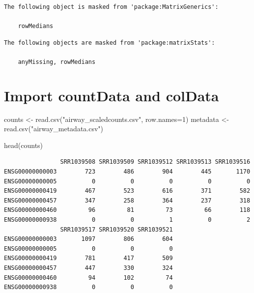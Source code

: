 \documentclass[
  letterpaper,
  DIV=11,
  numbers=noendperiod]{scrartcl}
\newenvironment{Shaded}{\begin{snugshade}}{\end{snugshade}}
\newcommand{\AttributeTok}[1]{\textcolor[rgb]{0.40,0.45,0.13}{#1}}
\newcommand{\DecValTok}[1]{\textcolor[rgb]{0.68,0.00,0.00}{#1}}
\newcommand{\FunctionTok}[1]{\textcolor[rgb]{0.28,0.35,0.67}{#1}}
\newcommand{\NormalTok}[1]{\textcolor[rgb]{0.00,0.23,0.31}{#1}}
\newcommand{\OtherTok}[1]{\textcolor[rgb]{0.00,0.23,0.31}{#1}}
\newcommand{\StringTok}[1]{\textcolor[rgb]{0.13,0.47,0.30}{#1}}
\begin{document}
\begin{verbatim}
The following object is masked from 'package:MatrixGenerics':

    rowMedians
\end{verbatim}

\begin{verbatim}
The following objects are masked from 'package:matrixStats':

    anyMissing, rowMedians
\end{verbatim}

\hypertarget{import-countdata-and-coldata}{%
\section{Import countData and
colData}\label{import-countdata-and-coldata}}

\begin{Shaded}
\begin{Highlighting}[]
\NormalTok{counts }\OtherTok{\textless{}{-}} \FunctionTok{read.csv}\NormalTok{(}\StringTok{"airway\_scaledcounts.csv"}\NormalTok{, }\AttributeTok{row.names=}\DecValTok{1}\NormalTok{)}
\NormalTok{metadata }\OtherTok{\textless{}{-}} \FunctionTok{read.csv}\NormalTok{(}\StringTok{"airway\_metadata.csv"}\NormalTok{)}
\end{Highlighting}
\end{Shaded}

\begin{Shaded}
\begin{Highlighting}[]
\FunctionTok{head}\NormalTok{(counts)}
\end{Highlighting}
\end{Shaded}

\begin{verbatim}
                SRR1039508 SRR1039509 SRR1039512 SRR1039513 SRR1039516
ENSG00000000003        723        486        904        445       1170
ENSG00000000005          0          0          0          0          0
ENSG00000000419        467        523        616        371        582
ENSG00000000457        347        258        364        237        318
ENSG00000000460         96         81         73         66        118
ENSG00000000938          0          0          1          0          2
                SRR1039517 SRR1039520 SRR1039521
ENSG00000000003       1097        806        604
ENSG00000000005          0          0          0
ENSG00000000419        781        417        509
ENSG00000000457        447        330        324
ENSG00000000460         94        102         74
ENSG00000000938          0          0          0
\end{verbatim}
\end{document}
